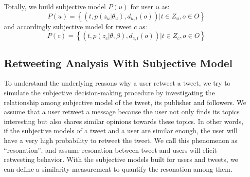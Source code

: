 \documentclass{acm_proc_article-sp}
\begin{document}
Totally, we build subjective model $ P\left( u \right) $ for user $ u $ as:
\begin{equation}
\label{subuser}
P\left( u \right)= \left\lbrace \left( t, p\left( z_{u} \vert \theta_{u} \right), d_{u,t}\left( o \right) \right)  \vert t \in Z_{u}, o \in O  \right\rbrace  
\end{equation}
and accordingly subjective model for tweet $ c $ as:
\begin{equation}
\label{subtweet}
P\left( c \right)= \left\lbrace \left( t, p\left( z_{c} \vert \theta, \beta \right), d_{c,t}\left( o \right) \right)  \vert t \in Z_{c}, o \in O  \right\rbrace  
\end{equation}

\subsection{Retweeting Analysis With Subjective Model}
\label{formulation}
To understand the underlying reasons why a user retweet a tweet, we try to simulate the subjective decision-making procedure by investigating the relationship among subjective model of the tweet, its publisher and followers. 
We assume that a user retweet a message because the user not only finds its topics interesting but also shares similar opinions towards these topics. In other words, if the subjective models of a tweet and a user are similar enough, the user will have a very high probability to retweet the tweet. 
We call this phenomenon as ``resonation'', and assume resonation between tweet and users will elicit retweeting behavior.
With the subjective models built for users and tweets, we can define a similarity measurement to quantify the resonation among them.
\end{document}
